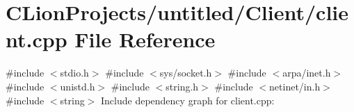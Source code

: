 \section{C\+Lion\+Projects/untitled/\+Client/client.cpp File Reference}
\label{client_8cpp}
{\ttfamily \#include $<$stdio.\+h$>$}\newline
{\ttfamily \#include $<$sys/socket.\+h$>$}\newline
{\ttfamily \#include $<$arpa/inet.\+h$>$}\newline
{\ttfamily \#include $<$unistd.\+h$>$}\newline
{\ttfamily \#include $<$string.\+h$>$}\newline
{\ttfamily \#include $<$netinet/in.\+h$>$}\newline
{\ttfamily \#include $<$string$>$}\newline
Include dependency graph for client.\+cpp\+:
